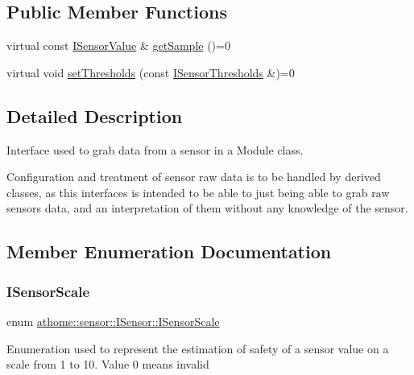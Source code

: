 \subsection*{Public Member Functions}
\begin{DoxyCompactItemize}
\item 
virtual const \mbox{\hyperlink{structathome_1_1sensor_1_1_i_sensor_1_1_i_sensor_value}{I\+Sensor\+Value}} \& \mbox{\hyperlink{classathome_1_1sensor_1_1_i_sensor_ae109cd3741ea9c88dc7e4f2eaf1485d5}{get\+Sample}} ()=0
\item 
virtual void \mbox{\hyperlink{classathome_1_1sensor_1_1_i_sensor_af86df8538fecfcfc670b4adfbbde6abb}{set\+Thresholds}} (const \mbox{\hyperlink{structathome_1_1sensor_1_1_i_sensor_1_1_i_sensor_thresholds}{I\+Sensor\+Thresholds}} \&)=0
\end{DoxyCompactItemize}


\subsection{Detailed Description}
Interface used to grab data from a sensor in a Module class.

Configuration and treatment of sensor raw data is to be handled by derived classes, as this interfaces is intended to be able to just being able to grab raw sensors data, and an interpretation of them without any knowledge of the sensor. 

\subsection{Member Enumeration Documentation}
\mbox{\label{classathome_1_1sensor_1_1_i_sensor_aa70bc27a4c17c86caf96cca776541ddf}} 
\subsubsection{\texorpdfstring{I\+Sensor\+Scale}{ISensorScale}}
{\footnotesize\ttfamily enum \mbox{\hyperlink{classathome_1_1sensor_1_1_i_sensor_aa70bc27a4c17c86caf96cca776541ddf}{athome\+::sensor\+::\+I\+Sensor\+::\+I\+Sensor\+Scale}}}

Enumeration used to represent the estimation of safety of a sensor value on a scale from 1 to 10. Value 0 means invalid 

